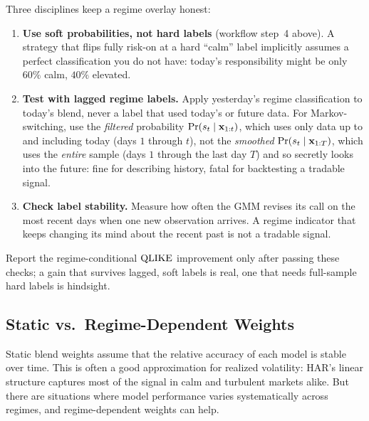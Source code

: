 \begin{warning}
Three disciplines keep a regime overlay honest:
\begin{enumerate}
  \item \textbf{Use soft probabilities, not hard labels} (workflow
        step~4 above).  A strategy that flips fully risk-on at a hard
        ``calm'' label implicitly assumes a perfect classification you do
        not have: today's responsibility might be only $60\%$ calm,
        $40\%$ elevated.
  \item \textbf{Test with lagged regime labels.}  Apply yesterday's
        regime classification to today's blend, never a label that used
        today's or future data.  For Markov-switching, use the
        \emph{filtered} probability $\Pr(s_t \mid \mathbf{x}_{1:t})$, which uses
        only data up to and including today (days $1$ through $t$), not
        the \emph{smoothed} $\Pr(s_t \mid \mathbf{x}_{1:T})$, which uses the
        \emph{entire} sample (days $1$ through the last day $T$) and so
        secretly looks into the future: fine for describing history, fatal
        for backtesting a tradable signal.
  \item \textbf{Check label stability.}  Measure how often the GMM
        revises its call on the most recent days when one new observation
        arrives.  A regime indicator that keeps changing its mind about
        the recent past is not a tradable signal.
\end{enumerate}
Report the regime-conditional $\operatorname{QLIKE}$ improvement only after passing
these checks; a gain that survives lagged, soft labels is real, one that
needs full-sample hard labels is hindsight.
\end{warning}



\subsection{Static vs.\ Regime-Dependent Weights}
\label{sec:hybrid:regime-weights}

Static blend weights assume that the relative accuracy of each model is
stable over time.  This is often a good approximation for realized
volatility: HAR's linear structure captures most of the signal in calm
and turbulent markets alike.  But there are situations where model
performance varies systematically across regimes, and regime-dependent
weights can help.

